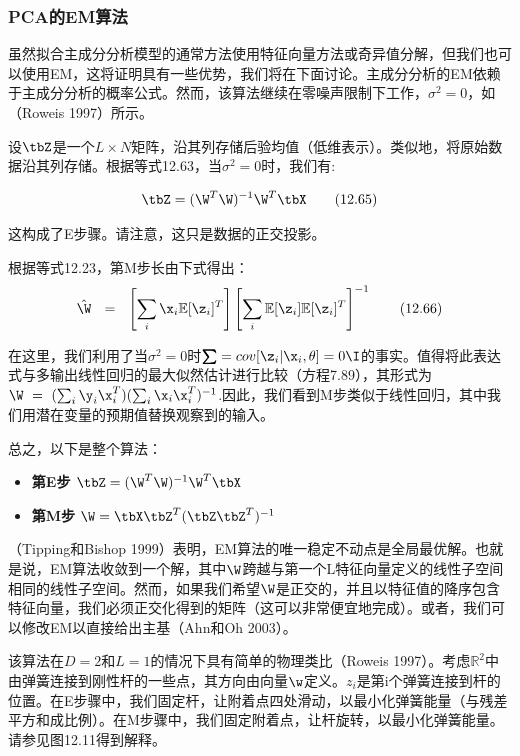 \documentclass[a4paper]{article}
\begin{document}
\subsubsection{PCA的EM算法}

虽然拟合主成分分析模型的通常方法使用特征向量方法或奇异值分解，但我们也可以使用EM，这将证明具有一些优势，我们将在下面讨论。主成分分析的EM依赖于主成分分析的概率公式。然而，该算法继续在零噪声限制下工作，$\sigma^2=0$，如（Roweis 1997）所示。 

设$\tbZ$是一个$L\times N$矩阵，沿其列存储后验均值（低维表示）。类似地，将原始数据沿其列存储。根据等式12.63，当$\sigma^2=0$时，我们有: 

\begin{equation}
	\tbZ=(\W^T\W)^{-1}\W^T\tbX\tag{12.65}
\end{equation}

这构成了E步骤。请注意，这只是数据的正交投影。

根据等式12.23，第M步长由下式得出：
\begin{equation}
	\hat{\W}\ \ =\ \ \left[\sum_{i}\x_i\mathbb{E}[\z_i]^T\right]\left[\sum_{i}\mathbb{E}[\z_i]\mathbb{E}[\z_i]^T\right]^{-1}\tag{12.66}
\end{equation}

在这里，我们利用了当$\sigma^2=0$时$\textstyle\boldsymbol{\sum}=cov[\z_i|\x_i,\theta]=0\I$的事实。值得将此表达式与多输出线性回归的最大似然估计进行比较（方程7.89），其形式为$\W\ =\ (\sum\nolimits_{i}\y_i\x_i^T)(\sum\nolimits_{i}\x_i\x_i^T)^{-1}$.因此，我们看到M步类似于线性回归，其中我们用潜在变量的预期值替换观察到的输入。 

总之，以下是整个算法：

\begin{itemize}
\item \textbf{第E步 $\tbZ=(\W^T\W)^{-1}\W^T\tbX$}
\item \textbf{第M步 $\W=\tbX\tbZ^T(\tbZ\tbZ^T)^{-1}$}
\end{itemize}

（Tipping和Bishop 1999）表明，EM算法的唯一稳定不动点是全局最优解。也就是说，EM算法收敛到一个解，其中$\W$跨越与第一个L特征向量定义的线性子空间相同的线性子空间。然而，如果我们希望$\W$是正交的，并且以特征值的降序包含特征向量，我们必须正交化得到的矩阵（这可以非常便宜地完成）。或者，我们可以修改EM以直接给出主基（Ahn和Oh 2003）。

该算法在$D=2$和$L=1$的情况下具有简单的物理类比（Roweis 1997）。考虑$\mathbb{R}^2$中由弹簧连接到刚性杆的一些点，其方向由向量$\w$定义。$z_i$是第i个弹簧连接到杆的位置。在E步骤中，我们固定杆，让附着点四处滑动，以最小化弹簧能量（与残差平方和成比例）。在M步骤中，我们固定附着点，让杆旋转，以最小化弹簧能量。请参见图12.11得到解释。 
\end{document}
